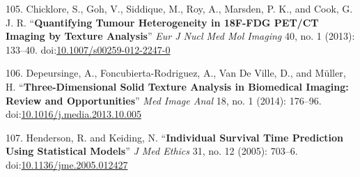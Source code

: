 \documentclass[11pt,]{article}
\begin{document}
\hypertarget{ref-Chicklore:2013aa}{}
105. Chicklore, S., Goh, V., Siddique, M., Roy, A., Marsden, P. K., and
Cook, G. J. R. ``\textbf{Quantifying Tumour Heterogeneity in 18F-FDG
PET/CT Imaging by Texture Analysis}'' \emph{Eur J Nucl Med Mol Imaging}
40, no. 1 (2013): 133--40.
doi:\href{https://doi.org/10.1007/s00259-012-2247-0}{10.1007/s00259-012-2247-0}

\hypertarget{ref-Depeursinge:2014aa}{}
106. Depeursinge, A., Foncubierta-Rodriguez, A., Van De Ville, D., and
Müller, H. ``\textbf{Three-Dimensional Solid Texture Analysis in
Biomedical Imaging: Review and Opportunities}'' \emph{Med Image Anal}
18, no. 1 (2014): 176--96.
doi:\href{https://doi.org/10.1016/j.media.2013.10.005}{10.1016/j.media.2013.10.005}

\hypertarget{ref-Henderson:2005aa}{}
107. Henderson, R. and Keiding, N. ``\textbf{Individual Survival Time
Prediction Using Statistical Models}'' \emph{J Med Ethics} 31, no. 12
(2005): 703--6.
doi:\href{https://doi.org/10.1136/jme.2005.012427}{10.1136/jme.2005.012427}
\end{document}
